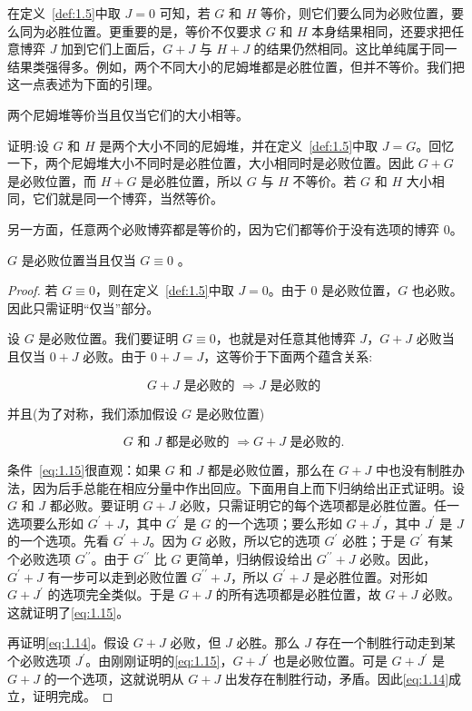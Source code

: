 在定义~\ref{def:1.5}中取 \(J=0\) 可知，若 \(G\) 和 \(H\) 等价，则它们要么同为必败位置，要么同为必胜位置。更重要的是，等价不仅要求 \(G\) 和 \(H\) 本身结果相同，还要求把任意博弈 \(J\) 加到它们上面后，\(G+J\) 与 \(H+J\) 的结果仍然相同。这比单纯属于同一结果类强得多。例如，两个不同大小的尼姆堆都是必胜位置，但并不等价。我们把这一点表述为下面的引理。

\begin{lemma}\label{lem:1.7}两个尼姆堆等价当且仅当它们的大小相等。\end{lemma}

证明:设 \(G\) 和 \(H\) 是两个大小不同的尼姆堆，并在定义~\ref{def:1.5}中取 \(J=G\)。回忆一下，两个尼姆堆大小不同时是必胜位置，大小相同时是必败位置。因此 \(G+G\) 是必败位置，而 \(H+G\) 是必胜位置，所以 \(G\) 与 \(H\) 不等价。若 \(G\) 和 \(H\) 大小相同，它们就是同一个博弈，当然等价。

另一方面，任意两个必败博弈都是等价的，因为它们都等价于没有选项的博弈 0。
\begin{lemma}\label{lem:1.8}
\(G\) 是必败位置当且仅当 \(G \equiv  0\) 。
\end{lemma}
\begin{proof}
若 \(G \equiv 0\)，则在定义~\ref{def:1.5}中取 \(J=0\)。由于 0 是必败位置，\(G\) 也必败。因此只需证明“仅当”部分。

设 \(G\) 是必败位置。我们要证明 \(G \equiv 0\)，也就是对任意其他博弈 \(J\)，\(G+J\) 必败当且仅当 \(0+J\) 必败。由于 \(0+J=J\)，这等价于下面两个蕴含关系:

\begin{equation}
G + J\text{ 是必败的 } \Rightarrow  J\text{ 是必败的 }  \label{eq:1.14}
\end{equation}

并且(为了对称，我们添加假设 \(G\) 是必败位置)

\begin{equation}
G\text{ 和 }J\text{ 都是必败的 } \Rightarrow  G + J\text{ 是必败的. }  \label{eq:1.15}
\end{equation}

条件~\eqref{eq:1.15}很直观：如果 \(G\) 和 \(J\) 都是必败位置，那么在 \(G+J\) 中也没有制胜办法，因为后手总能在相应分量中作出回应。下面用自上而下归纳给出正式证明。设 \(G\) 和 \(J\) 都必败。要证明 \(G+J\) 必败，只需证明它的每个选项都是必胜位置。任一选项要么形如 \({G}^{\prime}+J\)，其中 \({G}^{\prime}\) 是 \(G\) 的一个选项；要么形如 \(G+{J}^{\prime}\)，其中 \({J}^{\prime}\) 是 \(J\) 的一个选项。先看 \({G}^{\prime}+J\)。因为 \(G\) 必败，所以它的选项 \({G}^{\prime}\) 必胜；于是 \({G}^{\prime}\) 有某个必败选项 \({G}^{\prime\prime}\)。由于 \({G}^{\prime\prime}\) 比 \(G\) 更简单，归纳假设给出 \({G}^{\prime\prime}+J\) 必败。因此，\({G}^{\prime}+J\) 有一步可以走到必败位置 \({G}^{\prime\prime}+J\)，所以 \({G}^{\prime}+J\) 是必胜位置。对形如 \(G+{J}^{\prime}\) 的选项完全类似。于是 \(G+J\) 的所有选项都是必胜位置，故 \(G+J\) 必败。这就证明了\eqref{eq:1.15}。

再证明\eqref{eq:1.14}。假设 \(G+J\) 必败，但 \(J\) 必胜。那么 \(J\) 存在一个制胜行动走到某个必败选项 \({J}^{\prime}\)。由刚刚证明的\eqref{eq:1.15}，\(G+{J}^{\prime}\) 也是必败位置。可是 \(G+{J}^{\prime}\) 是 \(G+J\) 的一个选项，这就说明从 \(G+J\) 出发存在制胜行动，矛盾。因此\eqref{eq:1.14}成立，证明完成。
\end{proof}

